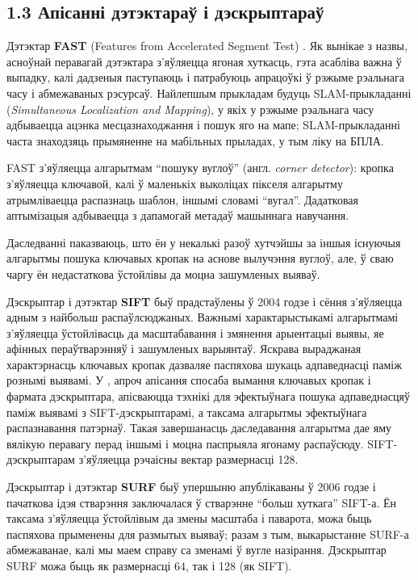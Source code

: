 \subsection*{1.3 Апісанні дэтэктараў і дэскрыптараў}

Дэтэктар \textbf{FAST} (Features from Accelerated Segment Test) \cite{fast-paper}. Як вынікае з назвы, асноўнай перавагай дэтэктара
з'яўляецца ягоная хуткасць, гэта асабліва важна ў выпадку, калі дадзеныя паступаюць і патрабуюць апрацоўкі ў рэжыме
рэальнага часу і абмежаваных рэсурсаў. Найлепшым прыкладам будуць SLAM-прыкладанні (\textit{Simultaneous Localization and Mapping}),
у якіх у рэжыме рэальнага часу адбываецца ацэнка месцазнаходжання і пошук яго на мапе; SLAM-прыкладанні часта знаходзяць прымяненне
на мабільных прыладах, у тым ліку на БПЛА.

FAST з'яўляецца алгарытмам ``пошуку вуглоў'' (англ. \textit{corner detector}): кропка з'яўляецца ключавой, калі ў маленькіх выколіцах
пікселя алгарытму атрымліваецца распазнаць шаблон, іншымі словамі ``вугал''. Дадатковая аптымізацыя адбываецца з дапамогай метадаў машыннага
навучання.

Даследванні паказваюць, што ён у некалькі разоў хутчэйшы за іншыя існуючыя алгарытмы пошука ключавых кропак на аснове
вылучэння вуглоў, але, ў сваю чаргу ён недастаткова ўстойлівы да моцна зашумленых выяваў.

Дэскрыптар і дэтэктар \textbf{SIFT} \cite{sift-paper} быў прадстаўлены ў 2004 годзе і сёння з'яўляецца адным з найбольш распаўлсюджаных.
Важнымі характарыстыкамі алгарытмамі з'яўляецца ўстойлівасць да масштабавання і змянення арыентацыі выявы, яе афінных пераўтварэнняў
і зашумленых варыянтаў. Яскрава выраджаная характэрнасць ключавых кропак дазваляе паспяхова шукаць адпаведнасці паміж
рознымі выявамі. У \cite{sift-paper}, апроч апісання спосаба вымання ключавых кропак і фармата дэскрыптара, апісваюцца тэхнікі для
эфектыўнага пошука адпаведнасцяў паміж выявамі з SIFT-дэскрыптарамі, а таксама алгарытмы эфектыўнага распазнавання патэрнаў.
Такая завершанасць даследавання алгарытма дае яму вялікую перавагу перад іншымі і моцна паспрыяла ягонаму распаўсюду.
SIFT-дэскрыптарам з'яўляецца рэчаісны вектар размернасці 128.

Дэскрыптар і дэтэктар \textbf{SURF} \cite{surf-paper} быў упершыню апублікаваны ў 2006 годзе і пачаткова ідэя стварэння заключалася
ў стварэнне ``больш хуткага'' SIFT-а. Ён таксама з'яўляецца ўстойлівым да змены масштаба і паварота, можа быць паспяхова прыменены
для размытых выяваў; разам з тым, выкарыстанне SURF-а абмежаванае, калі мы маем справу са зменамі ў вугле назірання. Дэскрыптар SURF
можа быць як размернасці 64, так і 128 (як SIFT).

